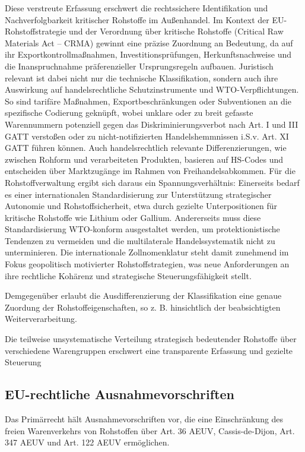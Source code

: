 \documentclass[12pt,a4paper,oneside]{book} %
\begin{document}
{Diese verstreute Erfassung erschwert die rechtssichere Identifikation und Nachverfolgbarkeit kritischer Rohstoffe im Außenhandel. Im Kontext der EU-Rohstoffstrategie und der Verordnung über kritische Rohstoffe (Critical Raw Materials Act – CRMA) gewinnt eine präzise Zuordnung an Bedeutung, da auf ihr Exportkontrollmaßnahmen, Investitionsprüfungen, Herkunftsnachweise und die Inanspruchnahme präferenzieller Ursprungsregeln aufbauen. Juristisch relevant ist dabei nicht nur die technische Klassifikation, sondern auch ihre Auswirkung auf handelsrechtliche Schutzinstrumente und WTO-Verpflichtungen. So sind tarifäre Maßnahmen, Exportbeschränkungen oder Subventionen an die spezifische Codierung geknüpft, wobei unklare oder zu breit gefasste Warennummern potenziell gegen das Diskriminierungsverbot nach Art. I und III GATT verstoßen oder zu nicht-notifizierten Handelshemmnissen i.S.v. Art. XI GATT führen können. Auch handelsrechtlich relevante Differenzierungen, wie zwischen Rohform und verarbeiteten Produkten, basieren auf HS-Codes und entscheiden über Marktzugänge im Rahmen von Freihandelsabkommen. Für die Rohstoffverwaltung ergibt sich daraus ein Spannungsverhältnis: Einerseits bedarf es einer internationalen Standardisierung zur Unterstützung strategischer Autonomie und Rohstoffsicherheit, etwa durch gezielte Unterpositionen für kritische Rohstoffe wie Lithium oder Gallium. Andererseits muss diese Standardisierung WTO-konform ausgestaltet werden, um protektionistische Tendenzen zu vermeiden und die multilaterale Handelssystematik nicht zu unterminieren. Die internationale Zollnomenklatur steht damit zunehmend im Fokus geopolitisch motivierter Rohstoffstrategien, was neue Anforderungen an ihre rechtliche Kohärenz und strategische Steuerungsfähigkeit stellt.

Demgegenüber erlaubt die Ausdifferenzierung der Klassifikation eine genaue Zuordung der Rohstoffeigenschaften, so z. B. hinsichtlich der beabsichtigten Weiterverarbeitung.\autocite{Schorkopf, Rohstoffverwaltung, Rn. 8.}

Die teilweise unsystematische Verteilung strategisch bedeutender Rohstoffe über verschiedene Warengruppen erschwert eine transparente Erfassung und gezielte Steuerung

\subsection{EU-rechtliche Ausnahmevorschriften}

Das Primärrecht hält Ausnahmevorschriften vor, die eine Einschränkung des freien Warenverkehrs von Rohstoffen über Art. 36 AEUV, Cassis-de-Dijon, Art. 347 AEUV und Art. 122 AEUV ermöglichen.\autocite{Schorkopf, Rohstoffverwaltung, Rn. 10}

}
\end{document}
